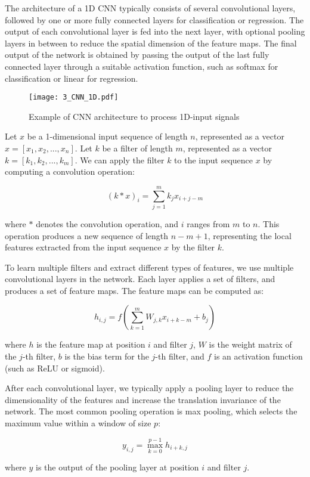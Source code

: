 The architecture of a 1D CNN typically consists of several convolutional layers, followed by one or more fully connected layers for classification or regression. The output of each convolutional layer is fed into the next layer, with optional pooling layers in between to reduce the spatial dimension of the feature maps. The final output of the network is obtained by passing the output of the last fully connected layer through a suitable activation function, such as softmax for classification or linear for regression.
 
 \begin{figure}[h]
 	\centering
 	\texttt{[image: 3\_CNN\_1D.pdf]}
 	\caption{Example of CNN architecture to process 1D-input signals}
 	\label{fig:3_CNN_1D}
 \end{figure}
 
Let $x$ be a 1-dimensional input sequence of length $n$, represented as a vector $x = [x_1, x_2, ..., x_n]$. Let $k$ be a filter of length $m$, represented as a vector $k = [k_1, k_2, ..., k_m]$. We can apply the filter $k$ to the input sequence $x$ by computing a convolution operation:

$$(k * x)_i = \sum_{j=1}^m k_j x_{i+j-m}$$

where $*$ denotes the convolution operation, and $i$ ranges from $m$ to $n$. This operation produces a new sequence of length $n - m + 1$, representing the local features extracted from the input sequence $x$ by the filter $k$.

To learn multiple filters and extract different types of features, we use multiple convolutional layers in the network. Each layer applies a set of filters, and produces a set of feature maps. The feature maps can be computed as:

$$h_{i,j} = f(\sum_{k=1}^m W_{j,k} x_{i+k-m} + b_j)$$

where $h$ is the feature map at position $i$ and filter $j$, $W$ is the weight matrix of the $j$-th filter, $b$ is the bias term for the $j$-th filter, and $f$ is an activation function (such as ReLU or sigmoid).

After each convolutional layer, we typically apply a pooling layer to reduce the dimensionality of the features and increase the translation invariance of the network. The most common pooling operation is max pooling, which selects the maximum value within a window of size $p$:

$$y_{i,j} = \max_{k=0}^{p-1} h_{i+k,j}$$

where $y$ is the output of the pooling layer at position $i$ and filter $j$.

